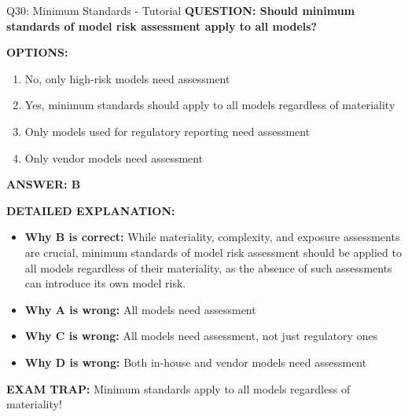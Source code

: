 \documentclass[8pt]{beamer}
\begin{document}
	\begin{frame}{Q30: Minimum Standards - Tutorial}
		\fontsize{6.5}{7.5}\selectfont
		\textbf{QUESTION: Should minimum standards of model risk assessment apply to all models?}
		
		\vspace{0.1cm}
		\textbf{OPTIONS:}
		\begin{enumerate}
			\item No, only high-risk models need assessment
			\item Yes, minimum standards should apply to all models regardless of materiality
			\item Only models used for regulatory reporting need assessment
			\item Only vendor models need assessment
		\end{enumerate}
		
		\vspace{0.1cm}
		\textcolor{myblue}{\textbf{ANSWER: B}}
		
		\vspace{0.1cm}
		\textbf{DETAILED EXPLANATION:}
		\begin{itemize}
			\item \textbf{Why B is correct:} While materiality, complexity, and exposure assessments are crucial, minimum standards of model risk assessment should be applied to all models regardless of their materiality, as the absence of such assessments can introduce its own model risk.
			\item \textbf{Why A is wrong:} All models need assessment
			\item \textbf{Why C is wrong:} All models need assessment, not just regulatory ones
			\item \textbf{Why D is wrong:} Both in-house and vendor models need assessment
		\end{itemize}
		
		\textcolor{myred}{\textbf{EXAM TRAP:}} Minimum standards apply to \textcolor{myblue}{all models regardless of materiality}!
	\end{frame}
	
\end{document}
